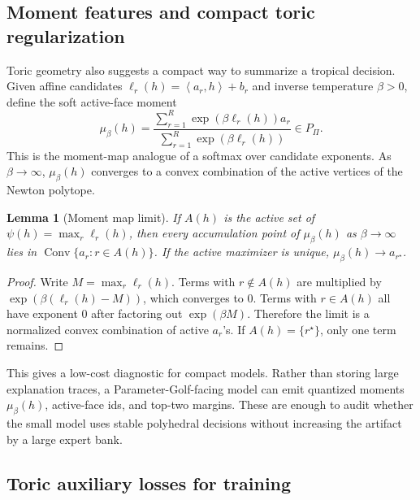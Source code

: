 \documentclass[11pt]{article}
\theoremstyle{definition}
\theoremstyle{plain}
\newtheorem{lemma}[definition]{Lemma}
\theoremstyle{remark}
\numberwithin{equation}{section}
\newcommand{\Conv}{\operatorname{Conv}}
\newcommand{\ip}[2]{\left\langle #1,#2\right\rangle}
\begin{document}
\subsection{Moment features and compact toric regularization}

Toric geometry also suggests a compact way to summarize a tropical decision.  Given affine candidates $\ell_r(h)=\ip{a_r}{h}+b_r$ and inverse temperature $\beta>0$, define the soft active-face moment
\begin{equation}
  \mu_\beta(h)=
  \frac{\sum_{r=1}^R \exp(\beta\ell_r(h))a_r}
       {\sum_{r=1}^R \exp(\beta\ell_r(h))}
  \in P_\Pi.
\end{equation}
This is the moment-map analogue of a softmax over candidate exponents.  As $\beta\to\infty$, $\mu_\beta(h)$ converges to a convex combination of the active vertices of the Newton polytope.

\begin{lemma}[Moment map limit]
If $A(h)$ is the active set of $\psi(h)=\max_r\ell_r(h)$, then every accumulation point of $\mu_\beta(h)$ as $\beta\to\infty$ lies in $\Conv\{a_r:r\in A(h)\}$.  If the active maximizer is unique, $\mu_\beta(h)\to a_{r^\star}$.
\end{lemma}

\begin{proof}
Write $M=\max_r\ell_r(h)$.  Terms with $r\notin A(h)$ are multiplied by $\exp(\beta(\ell_r(h)-M))$, which converges to $0$.  Terms with $r\in A(h)$ all have exponent $0$ after factoring out $\exp(\beta M)$.  Therefore the limit is a normalized convex combination of active $a_r$'s.  If $A(h)=\{r^\star\}$, only one term remains.
\end{proof}

This gives a low-cost diagnostic for compact models.  Rather than storing large explanation traces, a Parameter-Golf-facing model can emit quantized moments $\mu_\beta(h)$, active-face ids, and top-two margins.  These are enough to audit whether the small model uses stable polyhedral decisions without increasing the artifact by a large expert bank.

\subsection{Toric auxiliary losses for training}
\end{document}
